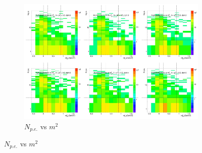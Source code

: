 \begin{figure}[H]
  \centering
    \begin{subfigure}{1\textwidth}
    \includegraphics[width=1\textwidth]{hiptfits/neg/PSaccthreshold_cent0_ich0_accfire0_ptbin12.jpg}
    \caption{$N_{p.e.}$ vs $m^2$}
    \end{subfigure}
\end{figure}

